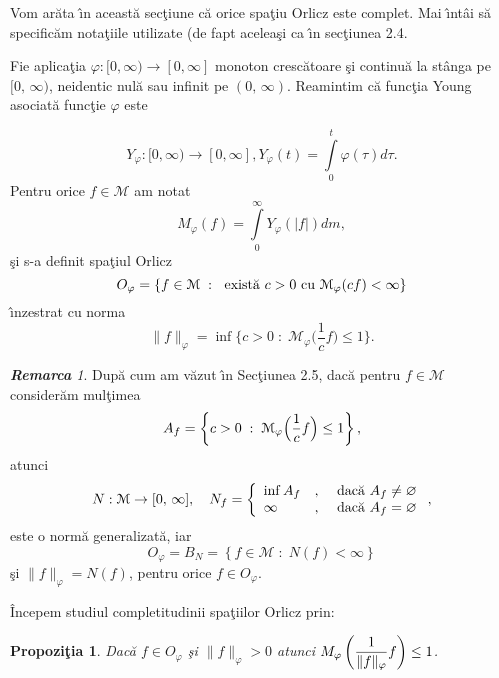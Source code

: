 \documentclass[ a4paper, 12pt]{report}
\newtheorem{prop}[theorem]{\bf Propozi\c tia }
\theoremstyle{definition}
\theoremstyle{remark}
\newtheorem{remarc}{\bf Remarca}[section]
\numberwithin{equation}{section}
\begin{document}
$\,$

Vom ar\u ata \^\i n aceast\u a sec\c tiune c\u a orice spa\c tiu Orlicz este complet. Mai \^\i nt\^ ai s\u a specific\u am nota\c tiile utilizate (de fapt acelea\c si ca \^\i n sec\c tiunea 2.4.

Fie aplica\c tia $\varphi : [0,\infty) \rightarrow [0,\infty]$ monoton cresc\u atoare \c si continu\u a la st\^ anga pe $[0, \, \infty)$, neidentic nul\u a sau infinit pe $(0, \, \infty)$. Reamintim c\u a func\c tia Young asociat\u a func\c tie $\varphi$ este

$$Y_\varphi : [0,\infty) \rightarrow [0,\infty], Y_\varphi(t) = \int\limits_{0}^{t} \varphi(\tau) d \tau.$$
Pentru orice $f \in \mathcal{M}$ am notat
$$M_\varphi(f) = \int\limits_{0}^{\infty} Y_\varphi(\lvert f \rvert) dm,$$
\c si s-a definit spa\c tiul Orlicz
$$O_\varphi = \{f \in \mathcal{M} \; : \; \hbox{ exist\u a } c>0  \hbox{ cu } \mathcal{M}_\varphi(cf)<\infty\}$$
\^\i nzestrat cu norma
$$\lVert f \rVert_\varphi = \inf\Big\{ c>0 \; : \; \mathcal{M}_\varphi\Big(\frac{1}{c}f\Big) \leq 1\Big \}.$$

\begin{remarc} Dup\u a cum am v\u azut \^\i n Sec\c tiunea 2.5, dac\u a pentru $f \in \mathcal{M}$ consider\u am mul\c timea
$$A_f = \left\{ c>0 \; : \;  \mathcal{M}_\varphi\Big(\displaystyle\frac{1}{c}f\Big) \leq 1 \right\},$$ atunci
$$N : \mathcal{M} \rightarrow [0,\, \infty], \quad N_f = \left\{ \begin{array}{lcl} \inf A_f&,& \hbox{ dac\u a } A_f \neq \varnothing\\
\infty &,& \hbox{ dac\u a } A_f = \varnothing \end{array} \right.,$$ este o norm\u a generalizat\u a, iar
$$O_\varphi = B_N = \left\{ f \in \mathcal{M} \; : \;  N(f) < \infty \right\}$$ \c si $\lVert f \rVert_\varphi = N(f)$, pentru orice $f \in O_\varphi.$
\end{remarc}

\^ Incepem studiul completitudinii spa\c tiilor Orlicz prin:

\begin{prop}
Dac\u a $f \in O_\varphi$ \c si $\lVert f \rVert_\varphi >0$ atunci $ M_\varphi\left (\displaystyle\frac{1}{\lVert f \rVert_\varphi}f\right )\leq 1$.
\end{prop}
\end{document}
